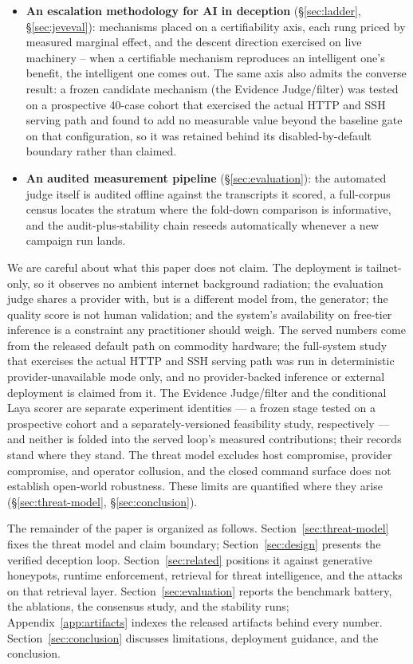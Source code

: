 \begin{itemize}
storing them. The package is published on artifact acceptance; this anonymous
submission carries no locator, and provider-backed reruns are labelled
unavailable.
\item \textbf{An escalation methodology for AI in deception}
(\S\ref{sec:ladder}, \S\ref{sec:jeveval}): mechanisms placed on a
certifiability axis, each rung priced by measured marginal effect, and
the descent direction exercised on live machinery -- when a certifiable
mechanism reproduces an intelligent one's benefit, the intelligent one
comes out. The same axis also admits the converse result: a frozen
candidate mechanism (the Evidence Judge/filter) was tested on a
prospective 40-case cohort that exercised the actual HTTP and SSH
serving path and found to add no measurable value beyond the baseline
gate on that configuration, so it was retained behind its
disabled-by-default boundary rather than claimed.
\item \textbf{An audited measurement pipeline} (\S\ref{sec:evaluation}):
the automated judge itself is audited offline against the transcripts it
scored, a full-corpus census locates the stratum where the fold-down
comparison is informative, and the audit-plus-stability chain reseeds
automatically whenever a new campaign run lands.
\end{itemize}

We are careful about what this paper does not claim. The deployment is
tailnet-only, so it observes no ambient internet background radiation; the
evaluation judge shares a provider with, but is a different model from, the
generator; the quality score is not human validation; and the system's
availability on free-tier inference is a constraint any practitioner should
weigh. The served numbers come from the released default path on commodity
hardware; the full-system study that exercises the actual HTTP and SSH
serving path was run in deterministic provider-unavailable mode only, and
no provider-backed inference or external deployment is claimed from it.
The Evidence Judge/filter and the conditional Laya scorer are separate
experiment identities --- a frozen stage tested on a prospective cohort
and a separately-versioned feasibility study, respectively --- and neither
is folded into the served loop's measured contributions; their records
stand where they stand. The threat model excludes host compromise, provider
compromise, and operator collusion, and the closed command surface does not
establish open-world robustness. These limits are quantified where they
arise (\S\ref{sec:threat-model}, \S\ref{sec:conclusion}).

The remainder of the paper is organized as follows.
Section~\ref{sec:threat-model} fixes the threat model and claim boundary;
Section~\ref{sec:design} presents the verified deception loop.
Section~\ref{sec:related} positions it against generative honeypots,
runtime enforcement, retrieval for threat intelligence, and the attacks on
that retrieval layer.
Section~\ref{sec:evaluation} reports the benchmark battery, the ablations,
the consensus study, and the stability runs; Appendix~\ref{app:artifacts}
indexes the released artifacts behind every number.
Section~\ref{sec:conclusion} discusses limitations, deployment guidance,
and the conclusion.

